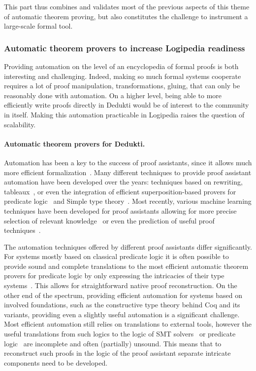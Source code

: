 This part thus combines and validates most of the previous aspects of
this theme of automatic theorem proving, but also constitutes the
challenge to instrument a large-scale formal tool.

\subsubsection*{Automatic theorem provers to increase Logipedia readiness}

Providing automation on the level of an encyclopedia of formal proofs
is both interesting and challenging. Indeed, making so much formal
systems cooperate requires a lot of proof manipulation,
transformations, gluing, that can only be reasonably done with
automation. On a higher level, being able to more efficiently write
proofs directly in Dedukti would be of interest to the community in
itself. Making this automation practicable in Logipedia raises the
question of scalability.

\paragraph*{Automatic theorem provers for Dedukti.}
Automation has been a key to the success of proof assistants, since it
allows much more efficient formalization~\cite{Hales-Developments}.
Many different techniques to provide proof assistant automation have
been developed over the years: techniques based on rewriting,
tableaux~\cite{Paulson-blast}, or even the integration of efficient
superposition-based provers for predicate logic~\cite{hurd-metis} and
Simple type theory~\cite{asperti-matita-paramodulation}. Most
recently, various machine learning techniques have been developed for
proof assistants allowing for more precise selection of relevant
knowledge~\cite{blanchette-h4qed-jfr} or even the prediction of useful
proof techniques~\cite{gauthier-tactictoe}.

The automation techniques offered by different proof assistants differ
significantly. For systems mostly based on classical predicate logic
it is often possible to provide sound and complete translations to the
most efficient automatic theorem provers for predicate logic by only
expressing the intricacies of their type
systems~\cite{kaliszyk-miz40}. This allows for straightforward native
proof reconstruction. On the other end of the spectrum, providing
efficient automation for systems based on involved foundations, such
as the constructive type theory behind Coq and its variants,
providing even a slightly useful automation is a significant
challenge. Most efficient automation still relies on translations to
external tools, however the useful translations from such logics to
the logic of SMT solvers~\cite{DBLP:conf/cpp/ArmandFGKTW11} or
predicate logic~\cite{DBLP:journals/jar/CzajkaK18} are incomplete
and often (partially) unsound. This means that to reconstruct such
proofs in the logic of the proof assistant separate intricate
components need to be developed.

